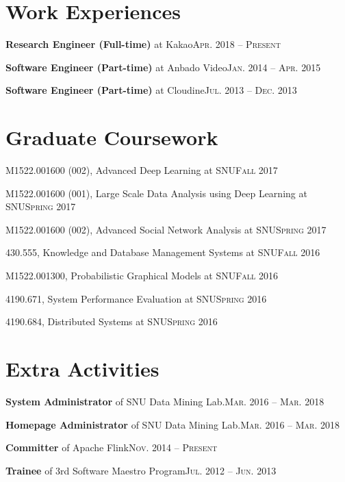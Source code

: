 \documentclass[11pt,a4paper]{article}
\renewenvironment{itemize}{
  \begin{list}{}{
    \setlength{\leftmargin}{1.5em}
    \setlength{\itemsep}{0.5em}
    \setlength{\parskip}{0pt}
    \setlength{\parsep}{0.25em}
  }
}{
  \end{list}
}
\begin{document}
\section*{Work Experiences}
\begin{itemize}
  \setlength\itemsep{0.1em}
  \item \textbf{Research Engineer (Full-time)} at Kakao\hfill\textsc{Apr. 2018 -- Present}
  \item \textbf{Software Engineer (Part-time)} at Anbado Video\hfill\textsc{Jan. 2014 -- Apr. 2015}
  \item \textbf{Software Engineer (Part-time)} at Cloudine\hfill\textsc{Jul. 2013 -- Dec. 2013}
\end{itemize}

\section*{Graduate Coursework}
\begin{itemize}
  \setlength\itemsep{0.1em}
  \item M1522.001600 (002), Advanced Deep Learning at SNU\hfill\textsc{Fall 2017}
  \item M1522.001600 (001), Large Scale Data Analysis using Deep Learning at SNU\hfill\textsc{Spring 2017}
  \item M1522.001600 (002), Advanced Social Network Analysis at SNU\hfill\textsc{Spring 2017}
  \item 430.555, Knowledge and Database Management Systems at SNU\hfill\textsc{Fall 2016}
  \item M1522.001300, Probabilistic Graphical Models at SNU\hfill\textsc{Fall 2016}
  \item 4190.671, System Performance Evaluation at SNU\hfill\textsc{Spring 2016}
  \item 4190.684, Distributed Systems at SNU\hfill\textsc{Spring 2016}
\end{itemize}

\section*{Extra Activities}
\begin{itemize}
  \setlength\itemsep{0.1em}
  \item \textbf{System Administrator} of SNU Data Mining Lab.\hfill\textsc{Mar. 2016 -- Mar. 2018}
  \item \textbf{Homepage Administrator} of SNU Data Mining Lab.\hfill\textsc{Mar. 2016 -- Mar. 2018}
  \item \textbf{Committer} of Apache Flink\hfill\textsc{Nov. 2014 -- Present}
  \item \textbf{Trainee} of 3rd Software Maestro Program\hfill\textsc{Jul. 2012 -- Jun. 2013}
\end{itemize}
\end{document}
